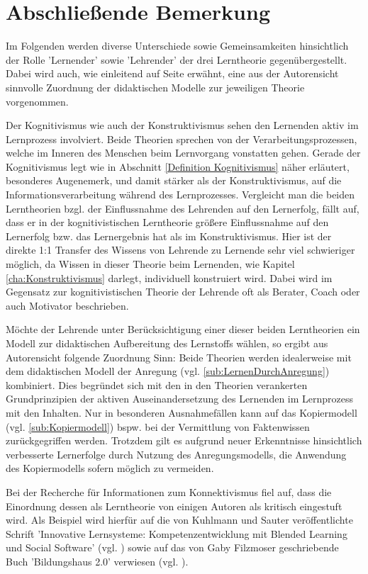 \chapter{Abschließende Bemerkung}
Im Folgenden werden diverse Unterschiede sowie Gemeinsamkeiten hinsichtlich der Rolle 'Lernender' sowie 'Lehrender' der drei Lerntheorie gegenübergestellt. Dabei wird auch, wie einleitend auf Seite \pageref{cha:Einleitung} erwähnt, eine aus der Autorensicht sinnvolle Zuordnung der didaktischen Modelle zur jeweiligen Theorie vorgenommen. 

Der Kognitivismus wie auch der Konstruktivismus sehen den Lernenden aktiv im Lernprozess involviert. Beide Theorien sprechen von der Verarbeitungsprozessen, welche im Inneren des Menschen beim Lernvorgang vonstatten gehen. Gerade der Kognitivismus legt wie in Abschnitt \ref{Definition Kognitivismus} näher erläutert, besonderes Augenemerk, und damit stärker als der Konstruktivismus, auf die Informationsverarbeitung während des Lernprozesses. Vergleicht man die beiden Lerntheorien bzgl. der Einflussnahme des Lehrenden auf den Lernerfolg, fällt auf, dass er in der kognitivistischen Lerntheorie größere Einflussnahme auf den Lernerfolg bzw. das Lernergebnis hat als im Konstruktivismus. Hier ist der direkte 1:1 Transfer des Wissens von Lehrende zu Lernende sehr viel schwieriger möglich, da Wissen in dieser Theorie beim Lernenden, wie Kapitel \ref{cha:Konstruktivismus} darlegt, individuell konstruiert wird. Dabei wird im Gegensatz zur kognitivistischen Theorie der Lehrende oft als Berater, Coach oder auch Motivator beschrieben. \cite[S. 30ff.]{Bohm.2006}

Möchte der Lehrende unter Berücksichtigung einer dieser beiden Lerntheorien ein Modell zur didaktischen Aufbereitung des Lernstoffs wählen, so ergibt aus Autorensicht folgende Zuordnung Sinn: Beide Theorien werden idealerweise mit dem didaktischen Modell der Anregung (vgl. \ref{sub:LernenDurchAnregung}) kombiniert. Dies begründet sich mit den in den Theorien verankerten Grundprinzipien der aktiven Auseinandersetzung des Lernenden im Lernprozess mit den Inhalten. Nur in besonderen Ausnahmefällen kann auf das Kopiermodell (vgl. \ref{sub:Kopiermodell}) bspw. bei der Vermittlung von Faktenwissen zurückgegriffen werden. Trotzdem gilt es aufgrund neuer Erkenntnisse hinsichtlich verbesserte Lernerfolge durch Nutzung des Anregungsmodells, die Anwendung des Kopiermodells sofern möglich zu vermeiden.

Bei der Recherche für Informationen zum Konnektivismus fiel auf, dass die Einordnung dessen als Lerntheorie von einigen Autoren als kritisch eingestuft wird. Als Beispiel wird hierfür auf die von Kuhlmann und Sauter veröffentlichte Schrift 'Innovative Lernsysteme: Kompetenzentwicklung mit Blended Learning und Social Software' (vgl. \cite{Kuhlmann.2008}) sowie auf das von Gaby Filzmoser geschriebende Buch 'Bildungshaus 2.0' verwiesen (vgl. \cite{Filzmoser.2013}).

